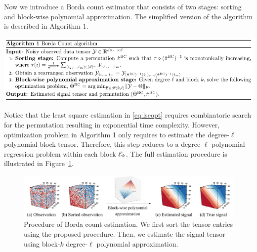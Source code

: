 \documentclass{article}
\theoremstyle{definition}
\begin{document}
Now we introduce a Borda count estimator that consists of two stages: sorting and block-wise polynomial approximation. The simplified version of the algorithm is described in Algorithm 1. 
\vspace{-.3cm}
\begin{center}
\includegraphics[width=.92\textwidth]{figures/algorithm_template.pdf}
\end{center}
\vspace{-.4cm}
 Notice that the least square estimation in \eqref{eq:lseopt} requires combinatoric search for the permutation resulting in exponential time complexity. However, optimization problem in Algorithm 1 only requires to estimate the degree-$\ell$ polynomial block tensor. Therefore, this step reduces to a degree-$\ell$ polynomial regression problem within each block $\mathcal{E}_k$.  The full estimation procedure is illustrated in Figure~\ref{fig:borda}.
\begin{figure}[htp]
    \centering
    \includegraphics[width = .8\textwidth]{figures/Borda2.pdf}
    \caption{Procedure of Borda count estimation. We first sort the tensor entries using the proposed procedure. Then, we estimate the signal tensor using block-$k$ degree-$\ell$ polynomial approximation.}
    \label{fig:borda}
    \vspace{-.6 cm}
\end{figure}
\end{document}
